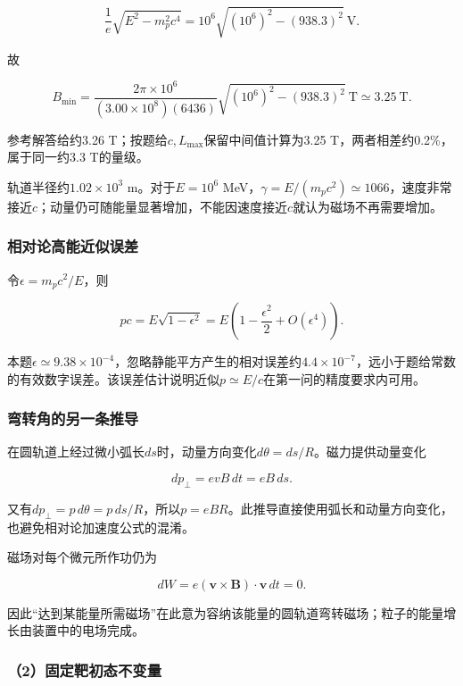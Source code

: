 \documentclass[12pt,a4paper,fontset=fandol]{ctexart}
\begin{document}
\[
\frac1e\sqrt{E^2-m_p^2c^4}
=10^6\sqrt{(10^6)^2-(938.3)^2}\ \mathrm V.
\]

故

\[
B_{\min}
=\frac{2\pi\times10^6}
{(3.00\times10^8)(6436)}
\sqrt{(10^6)^2-(938.3)^2}\ \mathrm T
\simeq\boxed{3.25\ \mathrm T}.
\]

参考解答给约3.26 T；按题给\(c,L_{\max}\)保留中间值计算为3.25
T，两者相差约0.2\%，属于同一约3.3 T的量级。

轨道半径约\(1.02\times10^3\) m。对于\(E=10^6\)
MeV，\(\gamma=E/(m_pc^2)\simeq1066\)，速度非常接近\(c\)；动量仍可随能量显著增加，不能因速度接近\(c\)就认为磁场不再需要增加。

\subsubsection{相对论高能近似误差}\label{ux76f8ux5bf9ux8bbaux9ad8ux80fdux8fd1ux4f3cux8befux5dee}

令\(\epsilon=m_pc^2/E\)，则

\[
pc=E\sqrt{1-\epsilon^2}
=E\left(1-\frac{\epsilon^2}{2}+O(\epsilon^4)\right).
\]

本题\(\epsilon\simeq9.38\times10^{-4}\)，忽略静能平方产生的相对误差约\(4.4\times10^{-7}\)，远小于题给常数的有效数字误差。该误差估计说明近似\(p\simeq E/c\)在第一问的精度要求内可用。

\subsubsection{弯转角的另一条推导}\label{ux5f2fux8f6cux89d2ux7684ux53e6ux4e00ux6761ux63a8ux5bfc}

在圆轨道上经过微小弧长\(ds\)时，动量方向变化\(d\theta=ds/R\)。磁力提供动量变化

\[
dp_\perp=evB\,dt=eB\,ds.
\]

又有\(dp_\perp=p\,d\theta=p\,ds/R\)，所以\(p=eBR\)。此推导直接使用弧长和动量方向变化，也避免相对论加速度公式的混淆。

磁场对每个微元所作功仍为

\[
dW=e(\mathbf v\times\mathbf B)\cdot\mathbf v\,dt=0.
\]

因此``达到某能量所需磁场''在此意为容纳该能量的圆轨道弯转磁场；粒子的能量增长由装置中的电场完成。

\subsubsection{（2）固定靶初态不变量}\label{ux56faux5b9aux9776ux521dux6001ux4e0dux53d8ux91cf}
\end{document}

